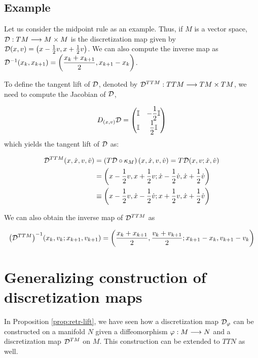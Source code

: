\subsection{Example}
\label{ex:midpoint-disc}
Let us consider the midpoint rule as an example. Thus, if $M$ is a vector space, $\mathcal{D} : TM \longrightarrow M \times M$ is the discretization map given by $\mathcal{D}(x,v) = \left( x - \frac{1}{2}v, x + \frac{1}{2}v \right)$. We can also compute the inverse map as $\mathcal{D}^{-1}(x_k, x_{k+1}) = \left(\dfrac{x_k + x_{k+1}}{2}, x_{k+1} - x_k \right)$.

\newpage

To define the tangent lift of $\mathcal{D}$, denoted by $\mathcal{D}^{TTM}: TTM \longrightarrow TM \times TM$, we need to compute the Jacobian of $\mathcal{D}$,

\[
  D_{(x,v)} \mathcal{D} = \begin{pmatrix}\mathbb{I} & -\dfrac{1}{2} \mathbb{I} \\ \mathbb{I} & \dfrac{1}{2} \mathbb{I}\end{pmatrix}
\]
which yields the tangent lift of $\mathcal{D}$ as:

\begin{equation*}
  \begin{split}
    \mathcal{D}^{TTM} (x, \dot{x}, v, \dot{v}) &= (T\mathcal{D} \circ \kappa_M)\left( x, \dot{x}, v, \dot{v} \right) = T\mathcal{D}(x, v ; \dot{x}, \dot{v}) \\
    &= \left( x - \dfrac{1}{2}v, x + \dfrac{1}{2}v ; \dot{x} - \dfrac{1}{2}\dot{v}, \dot{x} + \dfrac{1}{2} \dot{v} \right) \\
    & \equiv \left( x - \dfrac{1}{2}v, \dot{x} - \dfrac{1}{2}\dot{v} ; x + \dfrac{1}{2}v, \dot{x} + \dfrac{1}{2} \dot{v} \right)
  \end{split}
\end{equation*}

We can also obtain the inverse map of $\mathcal{D}^{TTM}$ as 

\[ {\left(\mathcal{D}^{TTM}\right)}^{-1} (x_k, v_k; x_{k+1}, v_{k+1}) = \left( \dfrac{x_k + x_{k+1}}{2}, \dfrac{v_k + v_{k+1}}{2}; x_{k+1} - x_k, v_{k+1} - v_k \right) \]

\section{Generalizing construction of discretization maps}

In Proposition \ref{prop:retr-lift}, we have seen how a discretization map $\mathcal{D}_{\varphi}$ can be constructed on a manifold $N$ given a diffeomorphism $\varphi: M \longrightarrow N$ and a discretization map $\mathcal{D}^{TM}$ on $M$. This construction can be extended to $TTN$ as well.

